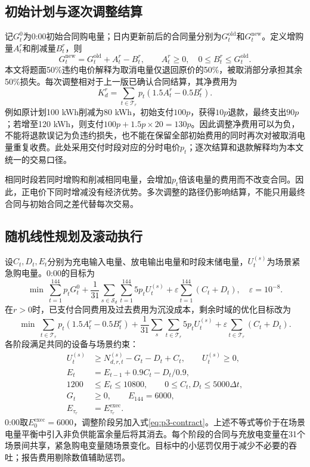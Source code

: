 \subsection{初始计划与逐次调整结算}
记$G^0_t$为0:00初始合同购电量；日内更新前后的合同量分别为$G^{\mathrm{old}}_t$和$G^{\mathrm{new}}_t$。定义增购量$A^r_t$和削减量$B^r_t$，则
\begin{equation}
G^{\mathrm{new}}_t=G^{\mathrm{old}}_t+A^r_t-B^r_t,
\qquad A^r_t\geq0,\quad 0\leq B^r_t\leq G^{\mathrm{old}}_t.
\label{eq:p3-contract}
\end{equation}
本文将题面50\%违约电价解释为取消电量仅退回原价的50\%，被取消部分承担其余50\%损失。每次调整相对于上一版已确认合同结算，其净费用为
\begin{equation}
K_d^r=\sum_{t\in\mathcal T_r}p_t(1.5A^r_t-0.5B^r_t).
\label{eq:p3-cash}
\end{equation}
例如原计划100 kWh削减为80 kWh，初始支付$100p$，获得$10p$退款，最终支出$90p$；若增至120 kWh，则支付$100p+1.5p\times20=130p$。因此调整净费用可以为负，不能将退款误记为负违约损失，也不能在保留全部初始费用的同时再次对被取消电量重复收费。此处采用交付时段对应的分时电价$p_t$；逐次结算和退款解释均为本文统一的交易口径。

相同时段若同时增购和削减相同电量，会增加$p_t$倍该电量的费用而不改变合同。因此，正电价下同时增减没有经济优势。多次调整的路径仍影响结算，不能只用最终合同与初始合同之差代替每次交易。

\subsection{随机线性规划及滚动执行}
设$C_t,D_t,E_t$分别为充电输入电量、放电输出电量和时段末储电量，$U^{(s)}_t$为场景紧急购电量。0:00的目标为
\begin{equation}
\min\ \sum_{t=1}^{144}p_tG^0_t
+\frac1{31}\sum_{s\in\mathcal S_d}\sum_{t=1}^{144}5p_tU^{(s)}_t
+\varepsilon\sum_{t=1}^{144}(C_t+D_t),\quad\varepsilon=10^{-8}.
\label{eq:p3-init}
\end{equation}
在$r>0$时，已支付合同费用及过去费用为沉没成本，剩余时域的优化目标改为
\begin{equation}
\min\ \sum_{t\in\mathcal T_r}p_t(1.5A^r_t-0.5B^r_t)
+\frac1{31}\sum_s\sum_{t\in\mathcal T_r}5p_tU^{(s)}_t
+\varepsilon\sum_{t\in\mathcal T_r}(C_t+D_t).
\label{eq:p3-roll}
\end{equation}
各阶段满足共同的设备与场景约束：
\begin{align}
U^{(s)}_t&\geq N^{(s)}_{d,r,t}-G_t-D_t+C_t,\qquad U^{(s)}_t\geq0,\\
E_t&=E_{t-1}+0.9C_t-D_t/0.9,\\
1200&\leq E_t\leq10800,\qquad 0\leq C_t,D_t\leq5000\Delta t,\\
G_t&\geq0,\qquad E_{144}=6000,\\
E_{\tau_r}&=E^{\mathrm{exec}}_{\tau_r}.\label{eq:p3-boundary}
\end{align}
0:00取$E^{\mathrm{exec}}_0=6000$，调整阶段另加入式\eqref{eq:p3-contract}。上述不等式等价于在场景电量平衡中引入非负供能富余量后将其消去。每个阶段的合同与充放电变量在31个场景间共享，紧急购电变量随场景变化。目标中的小惩罚仅用于减少不必要的吞吐；报告费用剔除数值辅助惩罚。

